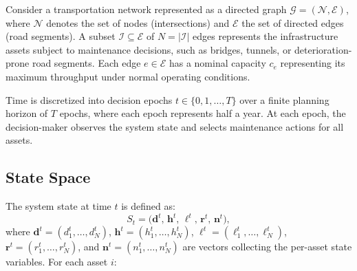 \documentclass[3p, twocolumn]{elsarticle}
\begin{document}
Consider a transportation network represented as a directed graph $\mathcal{G} = (\mathcal{N}, \mathcal{E})$, where $\mathcal{N}$ denotes the set of nodes (intersections) and $\mathcal{E}$ the set of directed edges (road segments). A subset $\mathcal{I} \subseteq \mathcal{E}$ of $N = |\mathcal{I}|$ edges represents the infrastructure assets subject to maintenance decisions, such as bridges, tunnels, or deterioration-prone road segments. Each edge $e \in \mathcal{E}$ has a nominal capacity $c_e$ representing its maximum throughput under normal operating conditions.

Time is discretized into decision epochs $t \in \{0, 1, \ldots, T\}$ over a finite planning horizon of $T$ epochs, where each epoch represents half a year. At each epoch, the decision-maker observes the system state and selects maintenance actions for all assets.

\subsection{State Space}
\label{subsec:state}

The system state at time $t$ is defined as:
\begin{equation}
    S_t = \big( \mathbf{d}^t,\, \mathbf{h}^t,\, \boldsymbol{\ell}^t,\, \mathbf{r}^t,\, \mathbf{n}^t \big),
    \label{eq:state}
\end{equation}
where $\mathbf{d}^t = (d_1^t, \ldots, d_N^t)$, $\mathbf{h}^t = (h_1^t, \ldots, h_N^t)$, $\boldsymbol{\ell}^t = (\ell_1^t, \ldots, \ell_N^t)$, $\mathbf{r}^t = (r_1^t, \ldots, r_N^t)$, and $\mathbf{n}^t = (n_1^t, \ldots, n_N^t)$ are vectors collecting the per-asset state variables. For each asset $i$:
\end{document}
